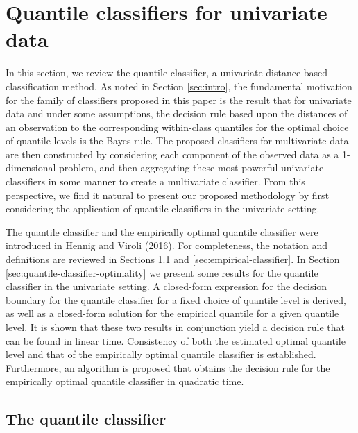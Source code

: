 
\section{Quantile classifiers for univariate data}
\label{sec:univariate-classifier}

In this section, we review the quantile classifier, a univariate distance-based
classification method.  As noted in Section \ref{sec:intro}, the fundamental
motivation for the family of classifiers proposed in this paper is the result
that for univariate data and under some assumptions, the decision rule based
upon the distances of an observation to the corresponding within-class quantiles
for the optimal choice of quantile levels is the Bayes rule.  The proposed
classifiers for multivariate data are then constructed by considering each
component of the observed data as a 1-dimensional problem, and then aggregating
these most powerful univariate classifiers in some manner to create a
multivariate classifier.  From this perspective, we find it natural to present
our proposed methodology by first considering the application of quantile
classifiers in the univariate setting.

The quantile classifier and the empirically optimal quantile classifier were
introduced in Hennig and Viroli (2016).  For completeness, the notation and
definitions are reviewed in Sections \ref{sec:quantile-classifier} and
\ref{sec:empirical-classifier}.  In Section
\ref{sec:quantile-classifier-optimality} we present some results for the
quantile classifier in the univariate setting.  A closed-form expression for the
decision boundary for the quantile classifier for a fixed choice of quantile
level is derived, as well as a closed-form solution for the empirical quantile
for a given quantile level.  It is shown that these two results in conjunction
yield a decision rule that can be found in linear time.  Consistency of both the
estimated optimal quantile level and that of the empirically optimal quantile
classifier is established.  Furthermore, an algorithm is proposed that obtains
the decision rule for the empirically optimal quantile classifier in quadratic
time.




\subsection{The quantile classifier}
\label{sec:quantile-classifier}

